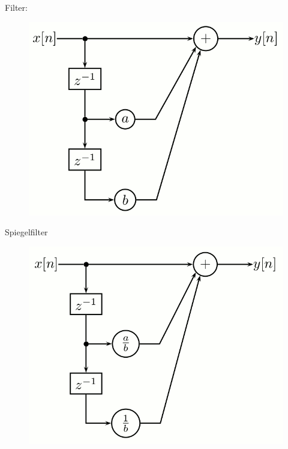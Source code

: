 \documentclass[a4paper, 12pt]{report}
\begin{document}
			\begin{minipage}[t]{0.5\textwidth}
				Filter:
				
				\begin{figure}[H]
					\includegraphics[width=\textwidth]{images/ma2_ab.png}
				\end{figure}
			\end{minipage}
			\begin{minipage}[t]{0.5\textwidth}
				Spiegelfilter
				
				\vspace{-0.1cm}
				
				\begin{figure}[H]
					\includegraphics[width=\textwidth]{images/ma2_ab_spiegel.png}
				\end{figure}
			\end{minipage}
			
\end{document}
